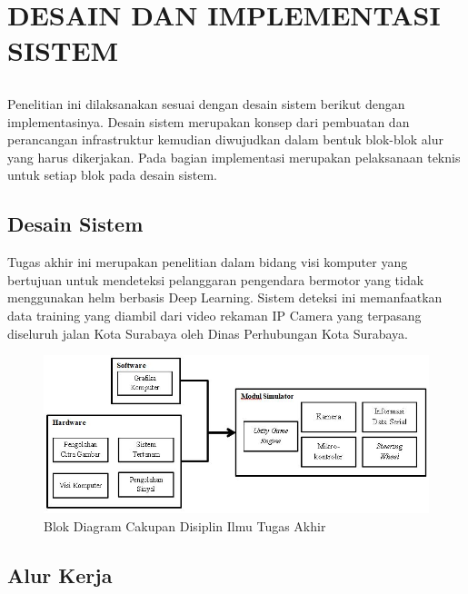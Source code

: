 \chapter{DESAIN DAN IMPLEMENTASI SISTEM}
\vspace{1ex}

\section*{}
	Penelitian ini dilaksanakan sesuai dengan desain sistem berikut dengan implementasinya. Desain sistem merupakan konsep dari pembuatan dan perancangan infrastruktur kemudian diwujudkan dalam bentuk blok-blok alur yang harus dikerjakan. Pada bagian implementasi merupakan pelaksanaan teknis untuk setiap blok pada desain sistem.
\vspace{1ex}

\section{Desain Sistem}
\vspace{1ex}

	\par Tugas akhir ini merupakan penelitian dalam bidang visi komputer yang bertujuan untuk mendeteksi pelanggaran pengendara bermotor yang tidak menggunakan helm berbasis Deep Learning. Sistem deteksi ini memanfaatkan data training yang diambil dari video rekaman IP Camera yang terpasang diseluruh jalan Kota Surabaya oleh Dinas Perhubungan Kota Surabaya.
\begin{figure}[H]
	\captionsetup{justification=centering}
	\includegraphics[scale=0.55]{img/cakupanTA.JPG}
	\caption{Blok Diagram Cakupan Disiplin Ilmu Tugas Akhir}
	\label{fig: 3_1}
\end{figure}
\vspace{1ex}

\section{Alur Kerja}
\vspace{1ex}


